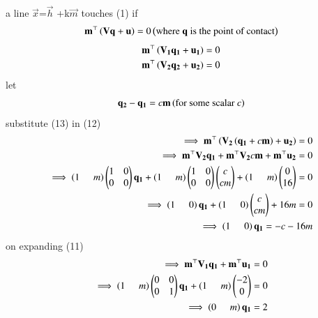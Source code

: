\documentclass[journal]{IEEEtran}
\begin{document}
a line $\vec{x}$=$\vec{h}$ +k$\vec{m}$ touches (1) if
\begin{align}
    \mathbf{m}^\top \left(\mathbf{V}\mathbf{q}+\mathbf{u}\right)=0 
    \left(\text{where $\mathbf{q}$ is the point of contact}\right)
\end{align}
\begin{align}
     \mathbf{m}^\top \left(\mathbf{V_1}\mathbf{q_1}+\mathbf{u_1}\right)=0\\
      \mathbf{m}^\top \left(\mathbf{V_2}\mathbf{q_2}+\mathbf{u_2}\right)=0 
\end{align}
let 
\begin{align}
    \mathbf{q_2}-\mathbf{q_1} = c\mathbf{m}
     \left(\text{for some scalar }c\right)
\end{align}
substitute (13) in (12)
\begin{align}
    \implies  \mathbf{m}^\top \left(\mathbf{V_2}\left(\mathbf{q_1}+c\mathbf{m}\right) + \mathbf{u_2}\right)=0\\
    \implies \mathbf{m}^\top\mathbf{V_2}\mathbf{q_1}+ \mathbf{m}^\top\mathbf{V_2}c\mathbf{m} + \mathbf{m}^\top\mathbf{u_2}=0\\
    \implies \left(1 \hspace{0.5cm} m\right)\begin{pmatrix}
        1 & 0\\
        0 & 0
    \end{pmatrix}\mathbf{q_1}+ \left(1 \hspace{0.5cm} m\right)\begin{pmatrix}
        1 & 0\\
        0 & 0
    \end{pmatrix} \begin{pmatrix}c\\cm\end{pmatrix} + \left(1 \hspace{0.5cm} m\right) \begin{pmatrix}0\\16\end{pmatrix}=0\\
  \implies  \left(1 \hspace{0.5cm} 0\right)\mathbf{q_1}+ \left(1 \hspace{0.5cm} 0\right) \begin{pmatrix}c\\cm\end{pmatrix} +16m =0\\
  \implies \left(1 \hspace{0.5cm} 0\right)\mathbf{q_1} =-c-16m
\end{align}
on expanding (11)
\begin{align}
    \implies \mathbf{m}^\top\mathbf{V_1}\mathbf{q_1}+  \mathbf{m}^\top\mathbf{u_1}=0\\
    \implies  \left(1 \hspace{0.5cm} m\right)\begin{pmatrix}
        0 & 0\\
        0 & 1
    \end{pmatrix}\mathbf{q_1}+  \left(1 \hspace{0.5cm} m\right) \begin{pmatrix}-2\\0\end{pmatrix}=0\\
    \implies \left(0 \hspace{0.5cm} m\right)\mathbf{q_1}=2
\end{align}\\ \\ \\ \\ 
\end{document}
